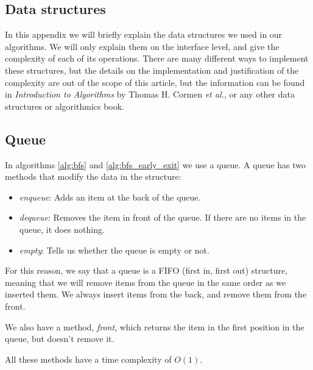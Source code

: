 \documentclass[12pt]{report}
\begin{document}



\begin{appendices}

\chapter{Data structures}

In this appendix we will briefly explain the data structures we used in our algorithms. We will only explain them on the interface level, and give the complexity of each of its operations. There are many different ways to implement these structures, but the details on the implementation and justification of the complexity are out of the scope of this article, but the information can be found in \emph{Introduction to Algorithms} by Thomas H. Cormen \textit{et al.}, or any other data structures or algorithmics book.

\section{Queue}
\label{annex:queue}
In algorithms \ref{alg:bfs} and \ref{alg:bfs_early_exit} we use a queue. A queue has two methods that modify the data in the structure:
\begin{itemize}
\item \emph{enqueue}: Adds an item at the back of the queue.
\item \emph{dequeue}: Removes the item in front of the queue. If there are no items in the queue, it does nothing.
\item \emph{empty}: Tells us whether the queue is empty or not.
\end{itemize}
For this reason, we say that a queue is a FIFO (first in, first out) structure, meaning that we will remove items from the queue in the same order as we inserted them. We always insert items from the back, and remove them from the front.

We also have a method, \emph{front}, which returns the item in the first position in the queue, but doesn't remove it.

All these methods have a time complexity of $O(1)$.


\end{appendices}
\end{document}
